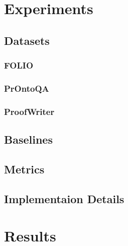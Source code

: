 \documentclass[conference]{IEEEtran}
\begin{document}
\section{Experiments}
\subsection{Datasets}

\subsubsection*{FOLIO}
\subsubsection*{PrOntoQA}
\subsubsection*{ProofWriter}


\subsection{Baselines}

\subsection{Metrics}

\subsection{Implementaion Details}

\section{Results}
\end{document}
